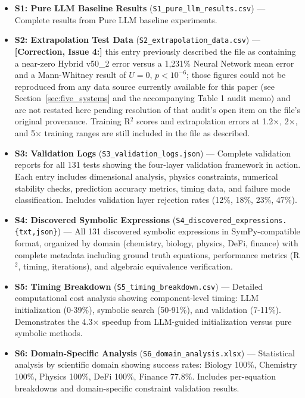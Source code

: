 \documentclass[twoside,11pt]{article}
\begin{document}
\begin{itemize}
\item \textbf{S1: Pure LLM Baseline Results} (\texttt{S1\_pure\_llm\_results.csv}) --- Complete results from Pure LLM baseline experiments.

\item \textbf{S2: Extrapolation Test Data} (\texttt{S2\_extra\-polation\_data.csv}) --- \textbf{[Correction, Issue 4:]} this entry previously described the file as containing a near-zero Hybrid v50\_2 error versus a 1{,}231\% Neural Network mean error and a Mann-Whitney result of $U=0$, $p<10^{-6}$; those figures could not be reproduced from any data source currently available for this paper (see Section~\ref{sec:five_systems} and the accompanying Table 1 audit memo) and are not restated here pending resolution of that audit's open item on the file's original provenance. Training R$^2$ scores and extrapolation errors at 1.2$\times$, 2$\times$, and 5$\times$ training ranges are still included in the file as described.

\item \textbf{S3: Validation Logs} (\texttt{S3\_validation\_logs.json}) --- Complete validation reports for all 131 tests showing the four-layer validation framework in action. Each entry includes dimensional analysis, physics constraints, numerical stability checks, prediction accuracy metrics, timing data, and failure mode classification. Includes validation layer rejection rates (12\%, 18\%, 23\%, 47\%).

\item \textbf{S4: Discovered Symbolic Expressions} (\texttt{S4\_discovered\_expressions.\{txt,json\}}) --- All 131 discovered symbolic expressions in SymPy-compatible format, organized by domain (chemistry, biology, physics, DeFi, finance) with complete metadata including ground truth equations, performance metrics (R$^2$, timing, iterations), and algebraic equivalence verification.

\item \textbf{S5: Timing Breakdown} (\texttt{S5\_timing\_breakdown.csv}) --- Detailed computational cost analysis showing component-level timing: LLM initialization (0-39\%), symbolic search (50-91\%), and validation (7-11\%). Demonstrates the 4.3× speedup from LLM-guided initialization versus pure symbolic methods.

\item \textbf{S6: Domain-Specific Analysis} (\texttt{S6\_domain\_analysis.xlsx}) --- Statistical analysis by scientific domain showing success rates: Biology 100\%, Chemistry 100\%, Physics 100\%, DeFi 100\%, Finance 77.8\%. Includes per-equation breakdowns and domain-specific constraint validation results.


\end{itemize}
\end{document}
